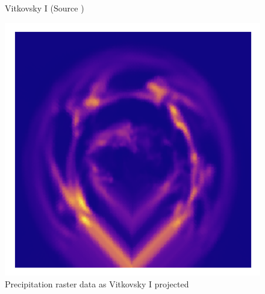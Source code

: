 \begin{figure}[h]
\begin{minipage}{0.30\textwidth}
        \caption{Vitkovsky I (Source \cite{PROJ_SITE})}
        \label{fig:vitk_proj}
    \end{minipage}\hfill
    \begin{minipage}{0.30\textwidth}
        \centering
        \includegraphics[width=0.9\linewidth]{figures/chapter-8/prect_vitk.png}
        \caption{Precipitation raster data as Vitkovsky I projected}
        \label{fig:vitk_prect_raster}
    \end{minipage}\hfill
\end{figure}
